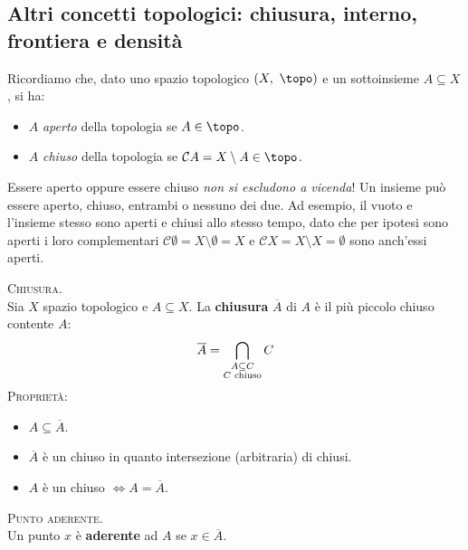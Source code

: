 \subsection{Altri concetti topologici: chiusura, interno, frontiera e densità}
Ricordiamo che, dato uno spazio topologico $\left(X,\ \topo\right)$ e un sottoinsieme $A\subseteq X$, si ha:
\begin{itemize}
\item $A$ \textit{aperto} della topologia se $A\in\topo$.
\item $A$ \textit{chiuso} della topologia se $\mathcal{C}A=X\setminus A\in\topo$.
\end{itemize}
\begin{attention}
Essere aperto oppure essere chiuso \textit{non si escludono a vicenda}! Un insieme può essere aperto, chiuso, entrambi o nessuno dei due. Ad esempio, il vuoto e l'insieme stesso sono aperti e chiusi allo stesso tempo, dato che per ipotesi sono aperti i loro complementari $\mathcal{C}\emptyset = X\setminus \emptyset = X$ e $\mathcal{C}X = X\setminus X = \emptyset$ sono anch'essi aperti.
\end{attention}
\begin{define}\textsc{Chiusura.}\\
Sia $X$ spazio topologico e $A\subseteq X$. La \textbf{chiusura} $\overline{A}$ di $A$ è il più piccolo chiuso contente $A$:
\begin{equation}
\overline{A}=\mathop{{\bigcap}}\displaylimits_{\substack{A\subseteq C\\ C\text{ chiuso}}}C
\end{equation}
\textsc{Proprietà:}
\begin{itemize}
\item $A\subseteq \overline{A}$.
\item $\overline{A}$ è un chiuso in quanto intersezione (arbitraria) di chiusi.
\item $A$ è un chiuso $\iff A=\overline{A}$.
\end{itemize}
\vspace{-3mm}
\end{define}
\begin{define}\textsc{Punto aderente.}\\
Un punto $x$ è \textbf{aderente} ad $A$ se $x\in\overline{A}$.
\end{define}
